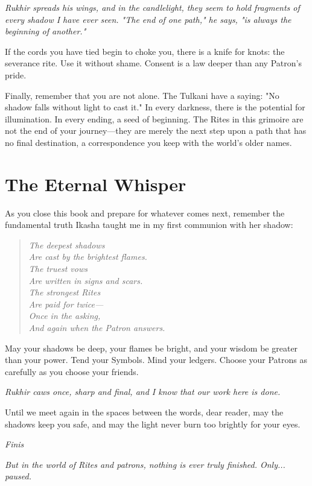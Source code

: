 \documentclass[12pt,twoside]{book}
\newcommand{\shadow}[1]{\textit{#1}}
\begin{document}
\shadow{Rukhir spreads his wings, and in the candlelight, they seem to hold fragments of every shadow I have ever seen. "The end of one path," he says, "is always the beginning of another."}

If the cords you have tied begin to choke you, there is a knife for knots: the severance rite. Use it without shame. Consent is a law deeper than any Patron’s pride.

Finally, remember that you are not alone. The Tulkani have a saying: "No shadow falls without light to cast it." In every darkness, there is the potential for illumination. In every ending, a seed of beginning. The Rites in this grimoire are not the end of your journey—they are merely the next step upon a path that has no final destination, a correspondence you keep with the world’s older names.

\section*{The Eternal Whisper}

As you close this book and prepare for whatever comes next, remember the fundamental truth Ikasha taught me in my first communion with her shadow:

\begin{verse}
\textit{The deepest shadows} \\
\textit{Are cast by the brightest flames.} \\
\textit{The truest vows} \\
\textit{Are written in signs and scars.} \\
\textit{The strongest Rites} \\
\textit{Are paid for twice—} \\
\textit{Once in the asking,} \\
\textit{And again when the Patron answers.}
\end{verse}

May your shadows be deep, your flames be bright, and your wisdom be greater than your power. Tend your Symbols. Mind your ledgers. Choose your Patrons as carefully as you choose your friends.

\shadow{Rukhir caws once, sharp and final, and I know that our work here is done.}

Until we meet again in the spaces between the words, dear reader, may the shadows keep you safe, and may the light never burn too brightly for your eyes.

\begin{center}
\textit{Finis}
\end{center}

\shadow{But in the world of Rites and patrons, nothing is ever truly finished. Only... paused.}
\end{document}
